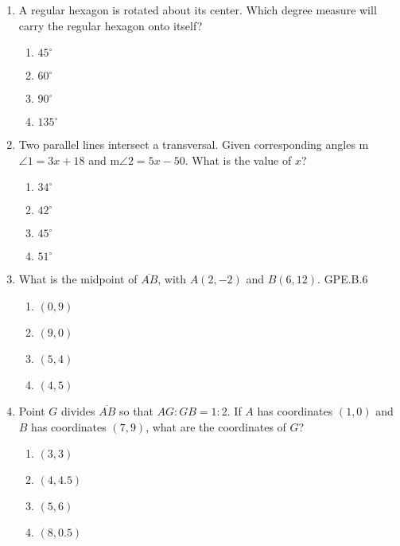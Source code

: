 \begin{enumerate}
\item A regular hexagon is rotated about its center. Which degree measure will carry the regular hexagon onto itself? 
\begin{multicols}{2}
\begin{enumerate}
  \item $45^\circ$
  \item $60^\circ$
  \item $90^\circ$
  \item $135^\circ$
\end{enumerate}
\end{multicols}

\item Two parallel lines intersect a transversal. Given corresponding angles  m$\angle 1 = 3x+18$ and m$\angle 2 = 5x-50$. What is the value of $x$?
\begin{multicols}{2}
  \begin{enumerate}
    \item $34^\circ$
    \item $42^\circ$
    \item $45^\circ$
    \item $51^\circ$
  \end{enumerate}
  \end{multicols}

\newpage
\item What is the midpoint of $\overline{AB}$, with $A(2,-2)$ and $B(6,12)$. \hfill GPE.B.6
\begin{multicols}{2}
  \begin{enumerate}
    \item $(0,9)$
    \item $(9,0)$
    \item $(5,4)$
    \item $(4,5)$
  \end{enumerate}
  \end{multicols} \vspace{1cm}

\item Point $G$ divides $\overline{AB}$ so that $AG:GB = 1:2$. If $A$ has coordinates $(1,0)$ and $B$ has coordinates $(7,9)$, what are the coordinates of $G$?
\begin{multicols}{2}
  \begin{enumerate}
    \item $(3,3)$
    \item $(4,4.5)$
    \item $(5,6)$
    \item $(8,0.5)$
  \end{enumerate}
  \end{multicols} \vspace{2cm}


\end{enumerate}
